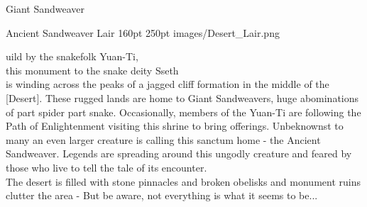 \documentclass[a4paper,openany,twoside,twocolumn]{book}
\begin{document}
\begin{DndMonster}[width=0.5\textwidth]{Giant Sandweaver}
    \DndMonsterAttack[
      name=Scythe Slashing,
      distance=melee, %
      mod=+6,
      reach=5,
      targets=one target,
      dmg={\DndDice{3d8 + 8}},
      dmg-type=piercing,
    ]
      
    \DndMonsterAttack[
      name=Web Shooter (Recharge 5-6),
      distance=ranged, %
      mod=+3,
      reach=20/60,
      targets=5 ft. radius,
      extra={Any target within the radius is restrained by webbing. As an action, the restrained target can make a DC 16 Strength check, bursting the web on a success. The webbing can also be attacked and destroyed (AC 10; HP 7; vulnerability to fire damage; immunity to bludgeoning, poison, and psychic damage)},
    ]
      
\end{DndMonster}


\MonsterBannerGraphic%
	{Ancient Sandweaver Lair}%
	{160pt}%
	{250pt}%
	{images/Desert_Lair.png}%
	{}%
	
\entryfont \noindent {}uild by the snakefolk Yuan-Ti,\\ this monument to the snake deity Sseth\\ is winding across the peaks of a jagged cliff formation in the middle of the [Desert]. These rugged lands are home to Giant Sandweavers, huge abominations of part spider part snake. Occasionally, members of the Yuan-Ti are following the Path of Enlightenment visiting this shrine to bring offerings. Unbeknownst to many an even larger creature is calling this sanctum home - the Ancient Sandweaver. Legends are spreading around this ungodly creature and feared by those who live to tell the tale of its encounter.\\
The desert is filled with stone pinnacles and broken obelisks and monument ruins clutter the area - But be aware, not everything is what it seems to be...
	
\end{document}
